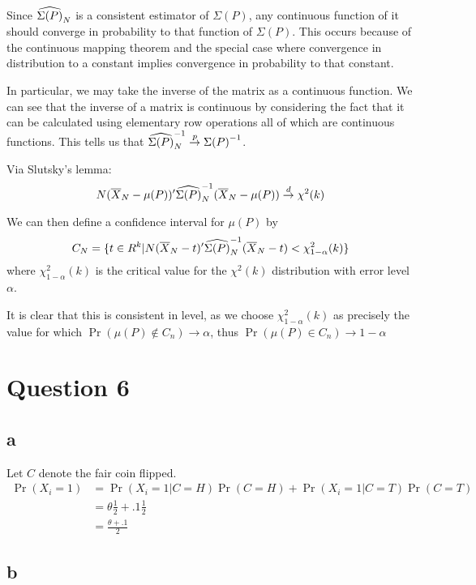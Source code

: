 \documentclass[12pt]{paper}
\begin{document}
Since $\widehat{ \Sigma(P) }_{N}$ is a consistent estimator of $\Sigma(P)$, any continuous
function of it should converge in probability to that function of
$\Sigma(P)$. This occurs because of the continuous mapping theorem and the
special case where convergence in distribution to a constant implies
convergence in probability to that constant.

In particular, we may take the inverse of the matrix as a continuous
function. We can see that the inverse of a matrix is continuous by
considering the fact that it can be calculated using elementary row
operations all of which are continuous functions. This tells us that
${\widehat{ \Sigma(P) }_{N}}^{-1} \overset{p}{\to} {\Sigma(P)}^{-1}$.

Via Slutsky's lemma:
\begin{equation*}
  N ( \overline{ X }_{N} - \mu(P))' {\widehat{ \Sigma(P) }_{N}}^{-1} ( \overline{ X }_{N} - \mu(P)) \overset{d}{\to}  \chi^2(k)
\end{equation*}

We can then define a confidence interval for $\mu(P)$ by
\begin{equation*}
  C_N = \{ t \in R^{k} | N ( \overline{ X }_{N} - t)^{\prime} {\widehat{ \Sigma(P) }_{N}}^{-1} (\overline{ X }_{N} - t) < \chi^2_{1-\alpha}(k)  \}
\end{equation*}
where $\chi^2_{1-\alpha}(k)$ is the critical value for the $\chi^2(k)$
distribution with error level $\alpha$.

It is clear that this is consistent in level, as we choose
$\chi^2_{1-\alpha}(k)$ as precisely the value for which
$\Pr( \mu(P) \notin C_n ) \rightarrow\alpha$, thus $\Pr( \mu(P) \in C_n ) \rightarrow 1 - \alpha$

\section*{Question 6}

\subsection*{a}
Let $C$ denote the fair coin flipped.
\begin{align*}
  \Pr( X_i = 1 ) &= \Pr( X_i = 1 | C = H) \Pr( C = H) + \Pr( X_i = 1 |
  C = T) \Pr( C = T)\\
                 &= \theta \frac{1}{2} + .1 \frac{1}{2}\\
  &= \frac{\theta + .1}{2}
\end{align*}

\subsection*{b}
\end{document}
